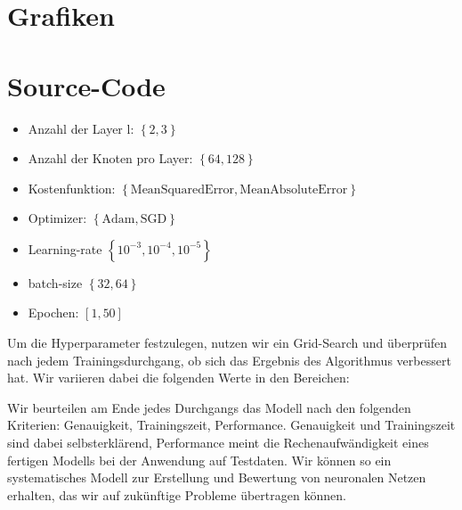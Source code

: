 \section{Grafiken}
\section{Source-Code}


%


\begin{itemize}
	\item Anzahl der Layer l: $\left\lbrace2, 3\right\rbrace$  
	\item Anzahl der Knoten pro Layer: $\left\lbrace64, 128 \right\rbrace $
	\item Kostenfunktion: $\left\lbrace \text{MeanSquaredError}, \text{MeanAbsoluteError} \right\rbrace$
	\item Optimizer: $\left\lbrace \text{Adam}, \text{SGD} \right\rbrace$
	\item Learning-rate $\left\lbrace 10^{-3}, 10^{-4}, 10^{-5} \right\rbrace$
	\item batch-size $\left\lbrace 32, 64 \right\rbrace$
	\item Epochen: $\left[1,50\right]$
\end{itemize}

Um die Hyperparameter festzulegen, nutzen wir ein Grid-Search und überprüfen nach jedem Trainingsdurchgang, ob sich das Ergebnis des Algorithmus verbessert hat. Wir variieren dabei die folgenden Werte in den Bereichen:

Wir beurteilen am Ende jedes Durchgangs das Modell nach den folgenden Kriterien: Genauigkeit, Trainingszeit, Performance. Genauigkeit und Trainingszeit sind dabei selbsterklärend, Performance meint die Rechenaufwändigkeit eines fertigen Modells bei der Anwendung auf Testdaten. Wir können so ein systematisches Modell zur Erstellung und Bewertung von neuronalen Netzen erhalten, das wir auf zukünftige Probleme übertragen können.

